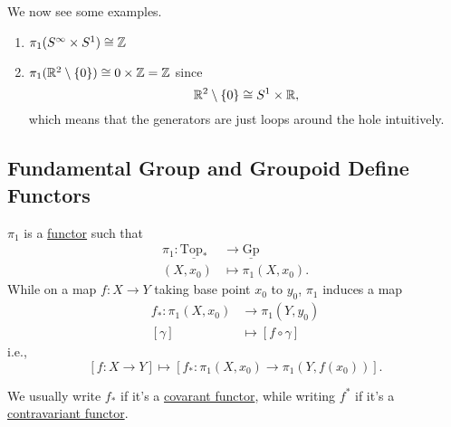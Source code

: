 \begin{eg}
	We now see some examples.
	\begin{enumerate}
		\item \(\pi _1(S^{\infty }\times S^1) \cong \mathbb{\MakeUppercase{z}} \)
		\item \(\pi _1(\mathbb{\MakeUppercase{r}} ^2\setminus \{0\}) \cong 0\times \mathbb{\MakeUppercase{z}} = \mathbb{\MakeUppercase{z}}\) since
		      \[
			      \mathbb{\MakeUppercase{r}} ^2\setminus \{0\}\cong S^{1}\times \mathbb{\MakeUppercase{r}},
		      \]
		      which means that the generators are just loops around the hole intuitively.
	\end{enumerate}
\end{eg}

\subsection{Fundamental Group and Groupoid Define Functors}
\begin{theorem}\label{thm:fundamental-group-defines-a-functor}
	\(\pi _1\) is a \hyperref[def:functor]{functor} such that
	\[
		\begin{split}
			\pi _1\colon \underline{\mathrm{Top}_*} &\to \underline{\mathrm{Gp}}\\
			(X, x_0)&\mapsto \pi _1(X, x_0).
		\end{split}
	\]
	While on a map \(f\colon X\to Y\) taking base point \(x_0\) to \(y_0\), \(\pi _1\) induces a map
	\[
		\begin{split}
			f_*\colon \pi _1(X, x_0)&\to \pi _1(Y, y_0)\\
			[\gamma]&\mapsto [f\circ \gamma]
		\end{split}
	\]
	i.e.,
	\[
		\left[f\colon X\to Y\right] \mapsto \left[f_*\colon \pi _1(X, x_0)\to \pi _1(Y, f(x_0))\right].
	\]
\end{theorem}
\begin{notation}
	We usually write \(f_*\) if it's a \hyperref[def:functor]{covarant functor}, while writing \(f^*\)
	if it's a \hyperref[def:contravariant-functor]{contravariant functor}.
\end{notation}
